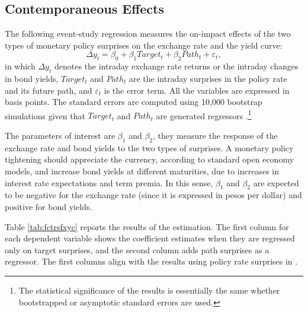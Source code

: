 \documentclass[a4paper, 12pt]{article}
\providecommand{\idxt}{t}
\providecommand{\yld}{y}
\providecommand{\depvar}{\Delta \yld_{\idxt}}
\providecommand{\paramB}{\beta}
\providecommand{\intrcpt}{\paramB_{0}}
\providecommand{\slopetrgt}{\paramB_{1}}
\providecommand{\slopepath}{\paramB_{2}}
\providecommand{\rtdonereg}{Target_{\idxt}}
\providecommand{\rtdtworeg}{Path_{\idxt}}
\providecommand{\errorreg}{\varepsilon_{\idxt}}
\newcommand{\eqTwoFacP}{\depvar = \intrcpt + \slopetrgt \rtdonereg + \slopepath \rtdtworeg + \errorreg}
\begin{document}
\subsection{Contemporaneous Effects}
The following event-study regression measures the on-impact effects of the two types of monetary policy surprises on the exchange rate and the yield curve:
\begin{equation} \label{eq:nTwoFacP}
	\eqTwoFacP ,
\end{equation}
\noindent in which \(\depvar\) denotes the intraday exchange rate returns or the intraday changes in bond yields, \(\rtdonereg\) and \(\rtdtworeg\) are the intraday surprises in the policy rate and its future path, and \(\errorreg\) is the error term. 
All the variables are expressed in basis points. 
The standard errors are computed using 10,000 bootstrap simulations given that \(\rtdonereg\) and \(\rtdtworeg\) are generated regressors \parencite[see][Appendix B]{Swanson:2021}.\footnote{The statistical significance of the results is essentially the same whether bootstrapped or asymptotic standard errors are used.}

The parameters of interest are \(\slopetrgt\) and \(\slopepath\), they measure the response of the exchange rate and bond yields to the two types of surprises. A monetary policy tightening should appreciate the currency, according to standard open economy models, and increase bond yields at different maturities, due to increases in interest rate expectations and term premia. In this sense, \(\slopetrgt\) and \(\slopepath\) are expected to be negative for the exchange rate (since it is expressed in pesos per dollar) and positive for bond yields.

Table \ref{tab:fctrsfxyc} reports the results of the estimation. The first column for each dependent variable shows the coefficient estimates when they are regressed only on target surprises, and the second column adds path surprises as a regressor. 
The first columns align with the results using policy rate surprises in \textcite{Solis:FX}.
\end{document}
